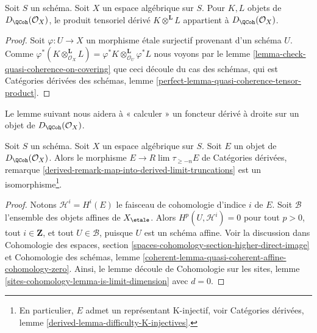 \begin{lemma}
\label{lemma-quasi-coherence-tensor-product}
Soit $S$ un schéma. Soit $X$ un espace algébrique sur $S$.
Pour $K, L$ objets de $D_\QCoh(\mathcal{O}_X)$,
le produit tensoriel dérivé $K \otimes^\mathbf{L} L$ appartient à
$D_\QCoh(\mathcal{O}_X)$.
\end{lemma}

\begin{proof}
Soit $\varphi : U \to X$ un morphisme \'etale surjectif provenant d'un schéma $U$.
Comme
$\varphi^*(K \otimes_{\mathcal{O}_X}^\mathbf{L} L) =
\varphi^*K \otimes_{\mathcal{O}_U}^\mathbf{L} \varphi^*L$
nous voyons par le
lemme \ref{lemma-check-quasi-coherence-on-covering}
que ceci découle du cas des schémas, qui est
Catégories dérivées des schémas, lemme
\ref{perfect-lemma-quasi-coherence-tensor-product}.
\end{proof}

\noindent
Le lemme suivant nous aidera à « calculer » un foncteur dérivé à droite
sur un objet de $D_\QCoh(\mathcal{O}_X)$.

\begin{lemma}
\label{lemma-nice-K-injective}
Soit $S$ un schéma. Soit $X$ un espace algébrique sur $S$. Soit $E$ un
objet de $D_\QCoh(\mathcal{O}_X)$. Alors le morphisme
$E \to R\lim \tau_{\geq -n}E$ de
Catégories dérivées, remarque
\ref{derived-remark-map-into-derived-limit-truncations}
est un isomorphisme\footnote{En particulier,
$E$ admet un représentant K-injectif, voir
Catégories dérivées, lemme \ref{derived-lemma-difficulty-K-injectives}.}.
\end{lemma}

\begin{proof}
Notons $\mathcal{H}^i = H^i(E)$ le faisceau de cohomologie d'indice $i$ de $E$.
Soit $\mathcal{B}$ l'ensemble des objets affines de $X_\etale$.
Alors $H^p(U, \mathcal{H}^i) = 0$ pour tout $p > 0$, tout $i \in \mathbf{Z}$,
et tout $U \in \mathcal{B}$, puisque $U$ est un schéma affine.
Voir la discussion dans
Cohomologie des espaces, section
\ref{spaces-cohomology-section-higher-direct-image}
et
Cohomologie des schémas, lemme
\ref{coherent-lemma-quasi-coherent-affine-cohomology-zero}.
Ainsi, le lemme découle de
Cohomologie sur les sites, lemme \ref{sites-cohomology-lemma-is-limit-dimension}
avec $d = 0$.
\end{proof}

